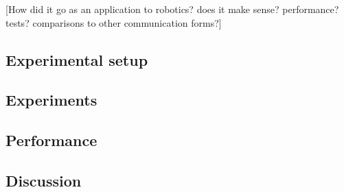 [How did it go as an application to robotics? does it make sense? performance? tests? comparisons to other communication forms?]

\subsection{Experimental setup}

\subsection{Experiments}

\subsection{Performance}

\subsection{Discussion}